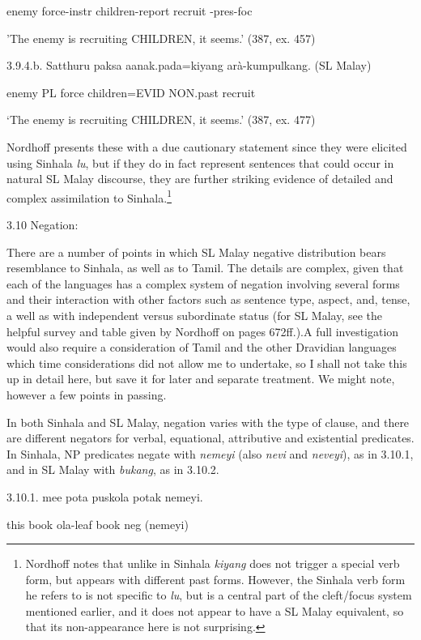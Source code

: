 \documentclass[letterpaper]{article}
\begin{document}
  enemy  force-instr children-report recruit -pres-foc  

'The enemy is recruiting CHILDREN, it seems.'  (387, ex. 457)

 3.9.4.b. 
\ea
\gll Satthuru paksa aanak.pada=kiyang arà-kumpulkang. (SL Malay)

  enemy  PL force children=EVID NON.past recruit  

   `The enemy is recruiting CHILDREN, it seems.' (387, ex. 477)

 Nordhoff presents these with a due cautionary statement since they were elicited using Sinhala \textit{lu}, but if they do in fact represent sentences that could occur in natural SL Malay discourse, they are further striking evidence of detailed and complex assimilation to Sinhala.\footnote{Nordhoff
  notes that unlike in Sinhala \textit{kiyang} does not trigger a special verb form, but appears with different past forms. However, the Sinhala verb form he refers to is not specific to \textit{lu}, but is a central part of the cleft/focus system mentioned earlier, and it does not appear to have  a SL Malay equivalent, so that its non-appearance here is not surprising.}

3.10 Negation:

 There are a number of points in which SL Malay negative distribution bears resemblance to Sinhala, as well as to Tamil. The details are complex, given that each of the languages has a complex system of negation involving several forms and their interaction with other factors such as sentence type, aspect, and, tense, a well as with independent versus subordinate status (for SL Malay, see the helpful survey and table given by Nordhoff on pages 672ff.).A full investigation would also require a consideration of Tamil and the other Dravidian languages which time considerations did not allow me to undertake, so I shall not take this up in detail here, but save it for later and separate treatment. We might note, however a few points in passing. 

 In both Sinhala and SL Malay, negation varies with the type of clause, and there are different negators for verbal, equational, attributive and existential predicates. In Sinhala, NP predicates negate with \textit{nemeyi} (also \textit{nevi} and \textit{neveyi}), as in 3.10.1, and in SL Malay with \textit{bukang}, as in 3.10.2.

3.10.1. 
\ea
\gll mee pota puskola potak nemeyi.

 this book ola-leaf book neg (nemeyi)
\end{document}
